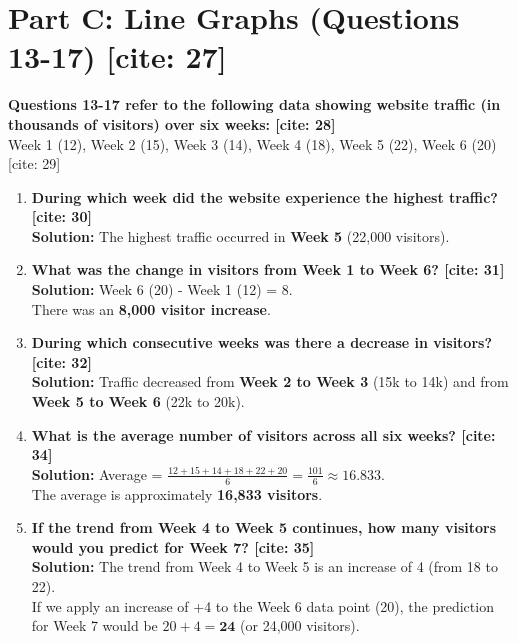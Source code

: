 \documentclass[11pt]{article}
\begin{document}
\section*{Part C: Line Graphs (Questions 13-17) [cite: 27]}

\noindent \textbf{Questions 13-17 refer to the following data showing website traffic (in thousands of visitors) over six weeks: [cite: 28]} \\
Week 1 (12), Week 2 (15), Week 3 (14), Week 4 (18), Week 5 (22), Week 6 (20) [cite: 29]

\begin{enumerate}[resume]
    \item \textbf{During which week did the website experience the highest traffic? [cite: 30]} \\
    \textbf{Solution:} The highest traffic occurred in \textbf{Week 5} (22,000 visitors).
    
    \item \textbf{What was the change in visitors from Week 1 to Week 6? [cite: 31]} \\
    \textbf{Solution:} Week 6 (20) - Week 1 (12) = 8. \\
    There was an \textbf{8,000 visitor increase}.
    
    \item \textbf{During which consecutive weeks was there a decrease in visitors? [cite: 32]} \\
    \textbf{Solution:} Traffic decreased from \textbf{Week 2 to Week 3} (15k to 14k) and from \textbf{Week 5 to Week 6} (22k to 20k).
    
    \item \textbf{What is the average number of visitors across all six weeks? [cite: 34]} \\
    \textbf{Solution:} Average = $\frac{12 + 15 + 14 + 18 + 22 + 20}{6} = \frac{101}{6} \approx 16.833$. \\
    The average is approximately \textbf{16,833 visitors}.
    
    \item \textbf{If the trend from Week 4 to Week 5 continues, how many visitors would you predict for Week 7? [cite: 35]} \\
    \textbf{Solution:} The trend from Week 4 to Week 5 is an increase of 4 (from 18 to 22). \\
    If we apply an increase of +4 to the Week 6 data point (20), the prediction for Week 7 would be $20 + 4 = \textbf{24}$ (or 24,000 visitors).
\end{enumerate}
\end{document}
